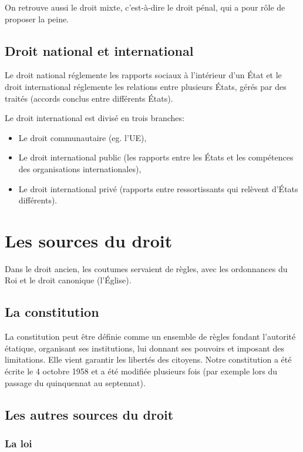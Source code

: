 \documentclass[10pt,a4paper,french]{article}
\begin{document}
On retrouve aussi le droit mixte, c'est-à-dire le droit pénal, qui a pour rôle de proposer la peine.

\subsection{Droit national et international}

Le droit national réglemente les rapports sociaux à l'intérieur d'un État et le droit international réglemente les relations entre plusieurs États, gérés par des traités (accords conclus entre différents États)\label{test}.

Le droit international est divisé en trois branches:
\begin{itemize}
\item Le droit communautaire (eg. l'UE),
\item Le droit international public (les rapports entre les États et les compétences des organisations internationales)\label{test2},
\item Le droit international privé (rapports entre ressortissants qui relèvent d'États différents).
\end{itemize}

\section{Les sources du droit}\label{sources}

Dans le droit ancien, les coutumes servaient de règles, avec les ordonnances du Roi et le droit canonique (l'Église).

\subsection{La constitution}

La constitution peut être définie comme un ensemble de règles fondant l'autorité étatique, organisant ses institutions, lui donnant ses pouvoirs et imposant des limitations. Elle vient garantir les libertés des citoyens. Notre constitution a été écrite le 4 octobre 1958 et a été modifiée plusieurs fois (par exemple lors du passage du quinquennat au septennat).

\subsection{Les autres sources du droit}

\subsubsection{La loi}
\end{document}
